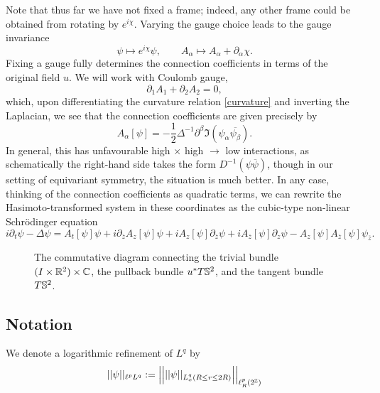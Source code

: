 Note that thus far we have not fixed a frame; indeed, any other frame could be obtained from rotating by $e^{i \chi}$. Varying the gauge choice leads to the gauge invariance
    \[
        \psi \mapsto e^{i \chi} \psi, \qquad A_\alpha \mapsto A_\alpha + \partial_\alpha \chi. 
    \]
Fixing a gauge fully determines the connection coefficients in terms of the original field $u$. We will work with Coulomb gauge, 
    \begin{equation}\label{eq:coulomb}
        \partial_1 A_1 + \partial_2 A_2 = 0,
    \end{equation}
which, upon differentiating the curvature relation \eqref{curvature} and inverting the Laplacian, we see that the connection coefficients are given precisely by 
    \begin{equation}\label{eq:coefficients}
        A_\alpha [\psi] 
            = -\frac12 \Delta^{-1} \partial^\beta \Im(\psi_\alpha \overline{\psi_\beta}). 
    \end{equation}
In general, this has unfavourable high $\times$ high $\to$ low interactions, as schematically the right-hand side takes the form $D^{-1} (\psi \overline \psi)$, though in our setting of equivariant symmetry, the situation is much better. In any case, thinking of the connection coefficients as quadratic terms, we can rewrite the Hasimoto-transformed system in these coordinates as the cubic-type non-linear Schr\"odinger equation 
    \begin{equation}
        i\partial_t \psi- \Delta \psi
            = A_t [\psi] \psi+ i \partial_{\overline z} A_z[\psi] \psi+ i A_z [\psi] \partial_{\overline z} \psi+ i A_{\overline z} [\psi] \partial_z \psi- A_z [\psi] A_{\overline z}[\psi] \psi_{\overline z}. 
    \end{equation}



\begin{figure}[h]
    \begin{center}
            \caption{The commutative diagram connecting the trivial bundle $(I \times \mathbb R^2) \times \mathbb C$, the pullback bundle $u^* T\mathbb S^2$, and the tangent bundle $T\mathbb S^2$. }
    \end{center}
\end{figure}

\subsection{Notation}

We denote a logarithmic refinement of $L^q$ by 
    \[
        ||\psi||_{\ell^p L^q} 
            := \Big|\Big| ||\psi||_{L^q_x (R \leq r \leq 2R)} \Big|\Big|_{\ell^p_R (2^\mathbb Z)}
    \]